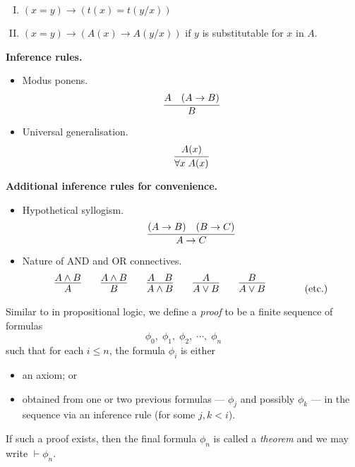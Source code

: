 \begin{mdframed}[linewidth=1pt]
\begin{enumerate}[I.]
    \item \((x = y) \rightarrow (t(x) = t(y/x))\)

    \item \((x = y) \rightarrow (A(x) \rightarrow A(y/x))\)\;\; if \(y\) is substitutable for \(x\) in \(A\).
\end{enumerate}

\vspace{1em}
\textbf{Inference rules.}

\begin{itemize}
    \item Modus ponens.
    \[
    \infer{B}{
        A
        &
        (A\rightarrow B)
    }
    \]

    \item Universal generalisation.
    \[\infer{\forall x\; A(x)}{A(x)}\]
\end{itemize}

\vspace{1em}
\textbf{Additional inference rules for convenience.}

\begin{itemize}
    \item Hypothetical syllogism.
    \[\infer{A \rightarrow C}{(A \rightarrow B) & (B \rightarrow C)}\]

    \item Nature of AND and OR connectives.
    \[
        \infer{A}{A \land B}
        \hspace{2em}
        \infer{B}{A \land B}
        \hspace{2em}
        \infer{A\land B}{A & B}
        \hspace{2em}
        \infer{A\lor B}{A}
        \hspace{2em}
        \infer{A\lor B}{B}
        \hspace{2em}
        \tag{etc.}
    \]
\end{itemize}

\end{mdframed}
\vspace{1em}

Similar to in propositional logic, we define a \emph{proof} to be a finite sequence of formulas
%
\[\phi_0,\; \phi_1,\; \phi_2,\; \cdots,\; \phi_n\]
%
such that for each \(i \leq n\), the formula \(\phi_i\) is either
%
\begin{itemize}
    \item an axiom; or
    \item obtained from one or two previous formulas --- \(\phi_j\) and possibly \(\phi_k\) --- in the sequence via an inference rule (for some \(j, k < i\)).
\end{itemize}
%
If such a proof exists, then the final formula \(\phi_n\) is called a \emph{theorem} and we may write \(\vdash \phi_n\).

